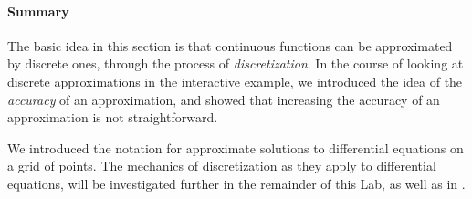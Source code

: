 
\paragraph{Summary}

The basic idea in this section is that continuous functions can be
approximated by discrete ones, through the process of {\em
  discretization}.  
In the course of looking at discrete
approximations in the interactive example, we introduced the idea of the
\emph{accuracy} of an approximation, and showed that increasing the
accuracy of an approximation is not straightforward.

We introduced the notation for approximate solutions to differential
equations on a grid of points.  The mechanics of discretization as
they apply to differential equations, will be investigated further in the remainder of
this Lab, as well as in .




